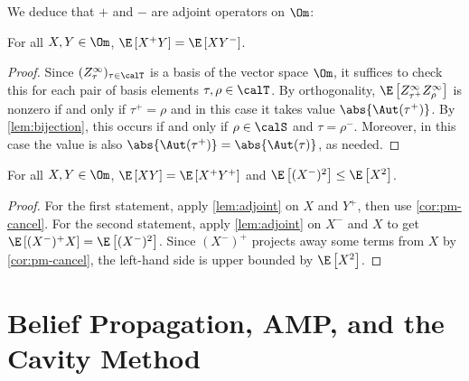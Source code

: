 \documentclass[12pt]{article}
\begin{document}
We deduce that $+$ and $-$ are adjoint operators on $\Om$:

\begin{lemma}\label{lem:adjoint}
    For all $X, Y \in \Om$,
    $\E\left[X^+Y\right] = \E\left[XY^-\right]$.
\end{lemma}
\begin{proof}
    Since $(Z^\infty_\tau)_{\tau \in \calT}$ is a
    basis of the vector space $\Om$, it suffices to check this
    for each pair of basis elements $\tau, \rho \in \calT$.
    By orthogonality,
    $\E\left[Z^\infty_{\tau^+}Z^\infty_\rho\right]$ is nonzero if and only if $\tau^+ = \rho$ and in this case it takes value $\abs{\Aut(\tau^+)}$.
    By \cref{lem:bijection}, this occurs if and only if $\rho\in\calS$ and $\tau = \rho^-$. Moreover, in this case the value is also $\abs{\Aut(\tau^+)} = \abs{\Aut(\tau)}$, as needed.
\end{proof}


\begin{lemma}\label{cor:adjoint}
    For all $X, Y \in \Om$,
    $\E\left[XY\right] = \E\left[X^+Y^+\right]$ and $\E\left[(X^-)^2\right] \leq \E\left[X^2\right]$.
\end{lemma}
\begin{proof}
    For the first statement, apply \cref{lem:adjoint} on $X$ and $Y^+$, then use \cref{cor:pm-cancel}.
    For the second statement, apply \cref{lem:adjoint} on $X^-$ and $X$ to get $\E\left[(X^-)^+ X\right] = \E\left[(X^-)^2\right]$. Since $(X^-)^+$ projects away some terms from $X$ by \cref{cor:pm-cancel},
    the left-hand side is upper bounded by $\E\left[X^2\right]$.
\end{proof}




\section{Belief Propagation, AMP, and the Cavity Method}
\label{sec:cavity-method}
\end{document}
